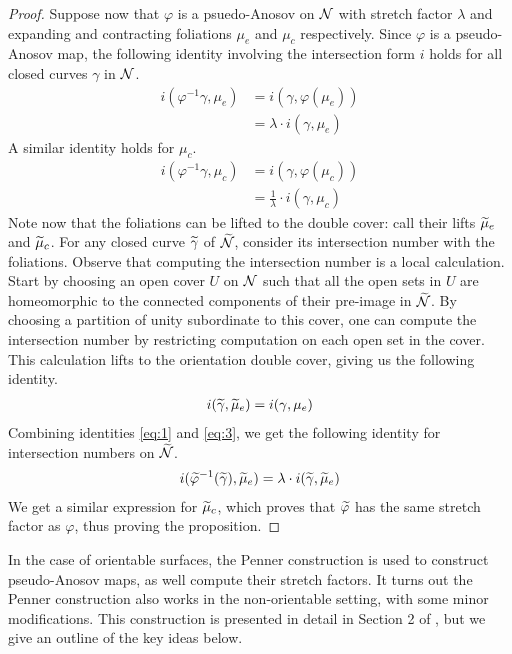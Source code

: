 \begin{proof}
  Suppose now that $\varphi$ is a psuedo-Anosov on $\mathcal{N}$ with stretch factor $\lambda$ and expanding and contracting foliations $\mu_e$ and $\mu_c$ respectively.
  Since $\varphi$ is a pseudo-Anosov map, the following identity involving the intersection form $i$ holds for all closed curves $\gamma$ in $\mathcal{N}$.
  \begin{align}
    \label{eq:1}
    i(\varphi^{-1}\gamma, \mu_e) &= i(\gamma, \varphi(\mu_e)) \\
                               &= \lambda \cdot i(\gamma, \mu_e)
  \end{align}
  A similar identity holds for $\mu_c$.
  \begin{align}
    \label{eq:2}
    i(\varphi^{-1}\gamma, \mu_c) &= i(\gamma, \varphi(\mu_c)) \\
                               &= \frac{1}{\lambda} \cdot i(\gamma, \mu_c)
  \end{align}
  Note now that the foliations can be lifted to the double cover: call their lifts $\widetilde{\mu}_e$ and $\widetilde{\mu}_c$.
  For any closed curve $\widetilde{\gamma}$ of $\widetilde{\mathcal{N}}$, consider its intersection number with the foliations.
  Observe that computing the intersection number is a local calculation.
  Start by choosing an open cover $U$ on $\mathcal{N}$ such that all the open sets in $U$ are homeomorphic to the connected components of their pre-image in $\widetilde{\mathcal{N}}$.
  By choosing a partition of unity subordinate to this cover, one can compute the intersection number by restricting computation on each open set in the cover.
  This calculation lifts to the orientation double cover, giving us the following identity.
  \begin{align}
    \label{eq:3}
    i(\widetilde{\gamma}, \widetilde{\mu}_e) = i(\gamma, \mu_e)
  \end{align}
  Combining identities \eqref{eq:1} and \eqref{eq:3}, we get the following identity for intersection numbers on $\widetilde{\mathcal{N}}$.
  \begin{align*}
    i(\widetilde{\varphi}^{-1} (\widetilde{\gamma}), \widetilde{\mu}_e) = \lambda \cdot i(\widetilde{\gamma}, \widetilde{\mu}_e)
  \end{align*}
  We get a similar expression for $\widetilde{\mu}_c$, which proves that $\widetilde{\varphi}$ has the same stretch factor as $\varphi$, thus proving the proposition.
\end{proof}

In the case of orientable surfaces, the Penner construction is used to construct pseudo-Anosov maps, as well compute their stretch factors. It turns out the Penner construction also works in the non-orientable setting, with some minor modifications. This construction is presented in detail in Section 2 of \cite{Strenner_2017}, but we give an outline of the key ideas below.

